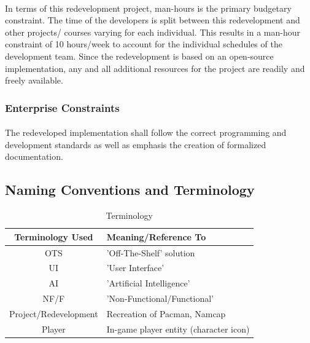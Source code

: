 \documentclass[12pt, titlepage]{article}
\begin{document}
\paragraph{}
In terms of this redevelopment project, man-hours is the primary budgetary constraint. The time of the developers is split between this redevelopment and other projects/ courses varying for each individual. This results in a man-hour constraint of 10 hours/week to account for the individual schedules of the development team.  Since the redevelopment is based on an open-source implementation, any and all additional resources for the project are readily and freely available.

\subsubsection{Enterprise Constraints}
\paragraph{}
The redeveloped implementation shall follow the correct programming and development standards as well as emphasis the creation of formalized documentation.

\subsection{Naming Conventions and Terminology}
\begin{table}[H]
\caption{Terminology} \label{tab:terms}
\begin{center}
\begin{tabular}{| c | l |}
\hline
\textbf{Terminology Used} & \textbf{Meaning/Reference To} \\ \hline
OTS & 'Off-The-Shelf' solution \\ \hline
UI & 'User Interface' \\ \hline
AI & 'Artificial Intelligence' \\ \hline
NF/F & 'Non-Functional/Functional' \\ \hline
Project/Redevelopment & Recreation of Pacman, Namcap \\ \hline
Player & In-game player entity (character icon)\\
\hline
\end{tabular}
\end{center}
\end{table}
\end{document}
